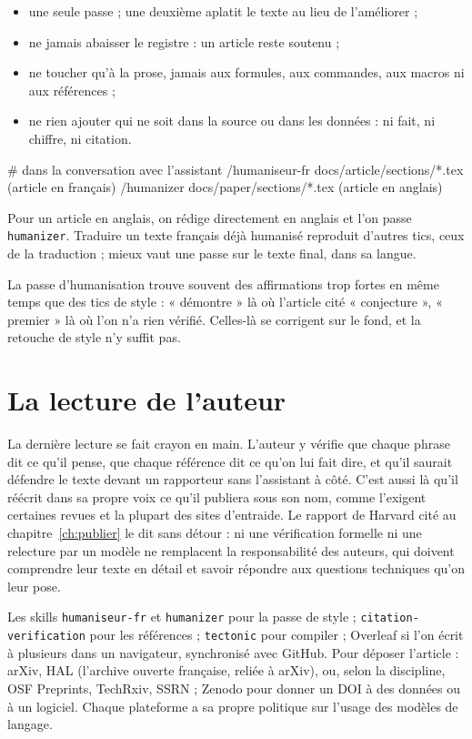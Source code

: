 \begin{itemize}
  \item une seule passe ; une deuxième aplatit le texte au lieu de l'améliorer ;
  \item ne jamais abaisser le registre : un article reste soutenu ;
  \item ne toucher qu'à la prose, jamais aux formules, aux commandes, aux macros ni aux
        références ;
  \item ne rien ajouter qui ne soit dans la source ou dans les données : ni fait, ni
        chiffre, ni citation.
\end{itemize}

\begin{terminal}
# dans la conversation avec l'assistant
/humaniseur-fr docs/article/sections/*.tex   (article en français)
/humanizer docs/paper/sections/*.tex         (article en anglais)
\end{terminal}

Pour un article en anglais, on rédige directement en anglais et l'on passe
\texttt{humanizer}. Traduire un texte français déjà humanisé reproduit d'autres tics,
ceux de la traduction ; mieux vaut une passe sur le texte final, dans sa langue.

\begin{tipblock}
La passe d'humanisation trouve souvent des affirmations trop fortes en même temps que des
tics de style : « démontre » là où l'article cité « conjecture », « premier » là où
l'on n'a rien vérifié. Celles-là se corrigent sur le fond, et la retouche de style n'y suffit pas.
\end{tipblock}

\section{La lecture de l'auteur}

La dernière lecture se fait crayon en main. L'auteur y vérifie que chaque phrase
dit ce qu'il pense, que chaque référence dit ce qu'on lui fait dire, et qu'il saurait
défendre le texte devant un rapporteur sans l'assistant à côté. C'est aussi là qu'il réécrit
dans sa propre voix ce qu'il publiera sous son nom, comme l'exigent certaines revues et la
plupart des sites d'entraide. Le rapport de Harvard cité au chapitre~\ref{ch:publier} le dit
sans détour : ni une vérification formelle ni une relecture par un modèle ne remplacent la
responsabilité des auteurs, qui doivent comprendre leur texte en détail et savoir répondre
aux questions techniques qu'on leur pose.

\begin{outils}
Les skills \texttt{humaniseur-fr} et \texttt{humanizer} pour la passe de style ;
\texttt{citation-verification} pour les références ; \texttt{tectonic} pour compiler ;
Overleaf si l'on écrit à plusieurs dans un navigateur, synchronisé avec GitHub. Pour déposer
l'article : arXiv, HAL (l'archive ouverte française, reliée à arXiv), ou, selon la
discipline, OSF Preprints, TechRxiv, SSRN ; Zenodo pour donner un DOI à des données ou à un
logiciel. Chaque plateforme a sa propre politique sur l'usage des modèles de langage.
\end{outils}
